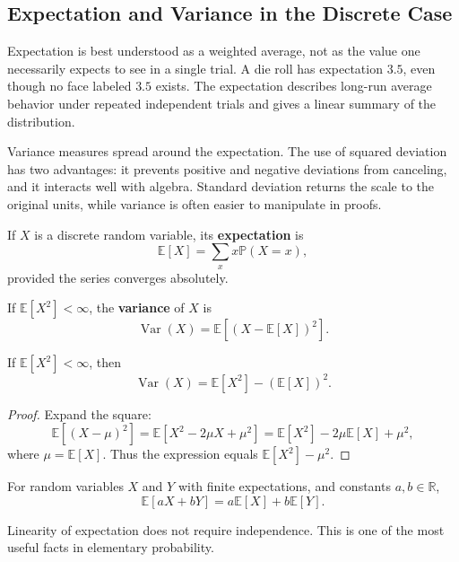 \subsection{Expectation and Variance in the Discrete Case}


Expectation is best understood as a weighted average, not as the value one necessarily expects to see in a single trial. A die roll has expectation $3.5$, even though no face labeled $3.5$ exists. The expectation describes long-run average behavior under repeated independent trials and gives a linear summary of the distribution.

Variance measures spread around the expectation. The use of squared deviation has two advantages: it prevents positive and negative deviations from canceling, and it interacts well with algebra. Standard deviation returns the scale to the original units, while variance is often easier to manipulate in proofs.

\begin{definition}[Expectation]
If $X$ is a discrete random variable, its \textbf{expectation} is
\[
    \mathbb{E}[X]=\sum_x x\mathbb{P}(X=x),
\]
provided the series converges absolutely.
\end{definition}

\begin{definition}[Variance]
If $\mathbb{E}[X^2]<\infty$, the \textbf{variance} of $X$ is
\[
    \operatorname{Var}(X)=\mathbb{E}[(X-\mathbb{E}[X])^2].
\]
\end{definition}

\begin{proposition}
If $\mathbb{E}[X^2]<\infty$, then
\[
    \operatorname{Var}(X)=\mathbb{E}[X^2]-(\mathbb{E}[X])^2.
\]
\end{proposition}

\begin{proof}
Expand the square:
\[
    \mathbb{E}[(X-\mu)^2]=\mathbb{E}[X^2-2\mu X+\mu^2]
    =\mathbb{E}[X^2]-2\mu\mathbb{E}[X]+\mu^2,
\]
where $\mu=\mathbb{E}[X]$. Thus the expression equals $\mathbb{E}[X^2]-\mu^2$.
\end{proof}

\begin{proposition}
For random variables $X$ and $Y$ with finite expectations, and constants $a,b\in\mathbb{R}$,
\[
    \mathbb{E}[aX+bY]=a\mathbb{E}[X]+b\mathbb{E}[Y].
\]
\end{proposition}

\begin{remark}
Linearity of expectation does not require independence. This is one of the most useful facts in elementary probability.
\end{remark}

